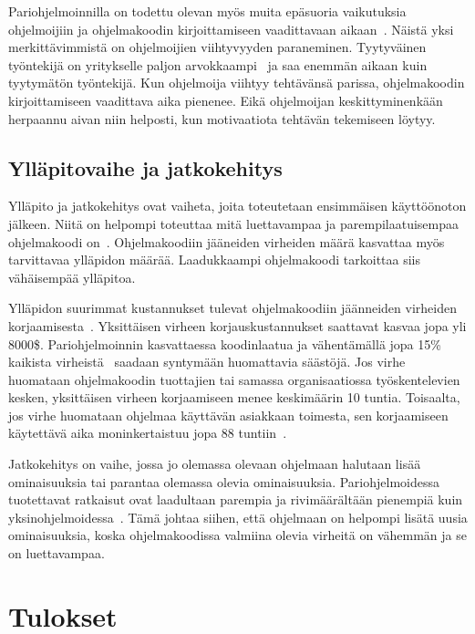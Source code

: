 \documentclass[finnish]{tktltiki2}
\theoremstyle{definition}
\theoremstyle{remark}
\begin{document}
Pariohjelmoinnilla on todettu olevan myös muita epäsuoria vaikutuksia ohjelmoijiin ja ohjelmakoodin kirjoittamiseen vaadittavaan aikaan~\cite{case}. Näistä yksi merkittävimmistä on ohjelmoijien viihtyvyyden paraneminen. Tyytyväinen työntekijä on yritykselle paljon arvokkaampi~\cite{airo2008oma} ja saa enemmän aikaan kuin tyytymätön työntekijä. Kun ohjelmoija viihtyy tehtävänsä parissa, ohjelmakoodin kirjoittamiseen vaadittava aika pienenee. Eikä ohjelmoijan keskittyminenkään herpaannu aivan niin helposti, kun motivaatiota tehtävän tekemiseen löytyy.

\subsection{Ylläpitovaihe ja jatkokehitys}

Ylläpito ja jatkokehitys ovat vaiheta, joita toteutetaan ensimmäisen käyttöönoton jälkeen. Niitä on helpompi toteuttaa mitä luettavampaa ja parempilaatuisempaa ohjelmakoodi on~\cite{costandbenefit2}. Ohjelmakoodiin jääneiden virheiden määrä kasvattaa myös tarvittavaa ylläpidon määrää. Laadukkaampi ohjelmakoodi tarkoittaa siis vähäisempää ylläpitoa.

Ylläpidon suurimmat kustannukset tulevat ohjelmakoodiin jäänneiden virheiden korjaamisesta~\cite{humphrey1994disciplined}. Yksittäisen virheen korjauskustannukset saattavat kasvaa jopa yli 8000\$. Pariohjelmoinnin kasvattaessa koodinlaatua ja vähentämällä jopa 15\% kaikista virheistä~\cite{costandbenefit2} saadaan syntymään huomattavia säästöjä. Jos virhe huomataan ohjelmakoodin tuottajien tai samassa organisaatiossa työskentelevien kesken, yksittäisen virheen korjaamiseen menee keskimäärin 10 tuntia. Toisaalta, jos virhe huomataan ohjelmaa käyttävän asiakkaan toimesta, sen korjaamiseen käytettävä aika moninkertaistuu jopa 88 tuntiin~\cite{humphrey1994disciplined}.

Jatkokehitys on vaihe, jossa jo olemassa olevaan ohjelmaan halutaan lisää ominaisuuksia tai parantaa olemassa olevia ominaisuuksia. Pariohjelmoidessa tuotettavat ratkaisut ovat laadultaan parempia ja rivimäärältään pienempiä kuin yksinohjelmoidessa~\cite{costandbenefit2}. Tämä johtaa siihen, että ohjelmaan on helpompi lisätä uusia ominaisuuksia, koska ohjelmakoodissa valmiina olevia virheitä on vähemmän ja se on luettavampaa.

\section{Tulokset}
\end{document}
